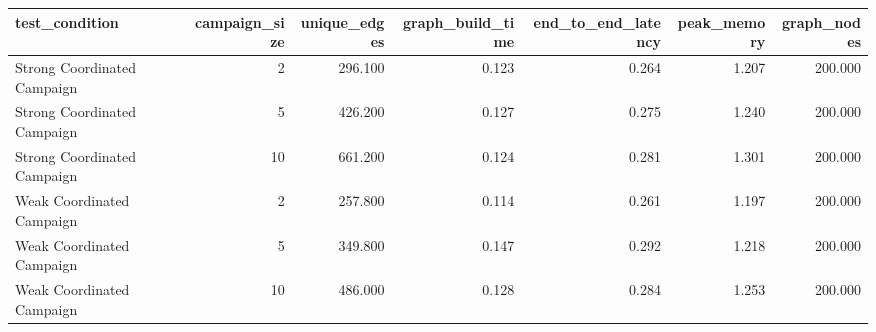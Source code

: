 \begin{tabular}{lrrrrrr}
\toprule
test_condition & campaign_size & unique_edges & graph_build_time & end_to_end_latency & peak_memory & graph_nodes \\
\midrule
Strong Coordinated Campaign & 2 & 296.100 & 0.123 & 0.264 & 1.207 & 200.000 \\
Strong Coordinated Campaign & 5 & 426.200 & 0.127 & 0.275 & 1.240 & 200.000 \\
Strong Coordinated Campaign & 10 & 661.200 & 0.124 & 0.281 & 1.301 & 200.000 \\
Weak Coordinated Campaign & 2 & 257.800 & 0.114 & 0.261 & 1.197 & 200.000 \\
Weak Coordinated Campaign & 5 & 349.800 & 0.147 & 0.292 & 1.218 & 200.000 \\
Weak Coordinated Campaign & 10 & 486.000 & 0.128 & 0.284 & 1.253 & 200.000 \\
\bottomrule
\end{tabular}
